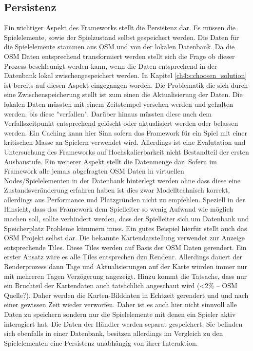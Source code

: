 \subsection*{Persistenz}

Ein wichtiger Aspekt des Frameworks stellt die Persistenz dar. Es müssen die Spielelemente, sowie der Spielzustand selbst gespeichert werden. Die Daten für die Spielelemente stammen aus OSM und von der lokalen Datenbank. Da die OSM Daten entsprechend transformiert werden stellt sich die Frage ob dieser Prozess beschleunigt werden kann, wenn die Daten entsprechend in der Datenbank lokal zwischengespeichert werden.
In Kapitel \ref{ch4:s:choosen_solution} ist bereits auf diesen Aspekt eingegangen worden. Die Problematik die sich durch eine Zwischenspeicherung stellt ist zum einen die Aktualisierung der Daten. Die lokalen Daten müssten mit einem Zeitstempel versehen werden und gehalten werden, bis diese "verfallen". Darüber hinaus müssten diese nach dem Verfallszeitpunkt entsprechend gelöscht oder aktualisiert werden oder belassen werden. Ein Caching kann hier Sinn sofern das Framework für ein Spiel mit einer kritischen Masse an Spielern verwendet wird. Allerdings ist eine Evalutation und Untersuchung des Frameworks auf Hochskalierbarkeit nicht Bestandteil der ersten Ausbaustufe. Ein weiterer Aspekt stellt die Datenmenge dar. Sofern im Framework alle jemals abgefragten OSM Daten in virtuellen Nodes/Spielelementen in der Datenbank hinterlegt werden ohne dass diese eine Zustandsveränderung erfahren haben ist dies zwar Modelltechnisch korrekt, allerdings aus Performance und Platzgründen nicht zu empfehlen. Speziell in der Hinsicht, dass das Framework dem Spielleiter so wenig Aufwand wie möglich machen soll, sollte verhindert werden, dass der Spielleiter sich um Datenbank und Speicherplatz Probleme kümmern muss. Ein gutes Beispiel hierfür stellt auch das OSM Projekt selbst dar. Die bekannte Kartendarstellung verwendet zur Anzeige entsprechende Tiles. Diese Tiles werden auf Basis der OSM Daten gerendert. Ein erster Ansatz wäre es alle Tiles entsprechen dzu Rendenr. Allerdings dauert der Renderprozess dann Tage und Aktualisierungen auf der Karte würden immer nur mit mehreren Tagen Verzögerung angezeigt. Hinzu kommt die Tatsache, dass nur ein Bruchteil der Kartendaten auch tatsächlich angeschaut wird (<2\% -- OSM Quelle?). Daher werden die Karten-Bilddaten in Echtzeit gerendert und und nach einer gewissen Zeit wieder verworfen.
Daher ist es auch hier nicht sinnvoll alle Daten zu speichern sondern nur die Spielelemente mit denen ein Spieler aktiv interagiert hat.
Die Daten der Händler werden separat gespeichert. Sie befinden sich ebenfalls in einer Datenbank, besitzen allerdings im Vergleich zu den Spielelementen eine Persistenz unabhängig von ihrer Interaktion.


